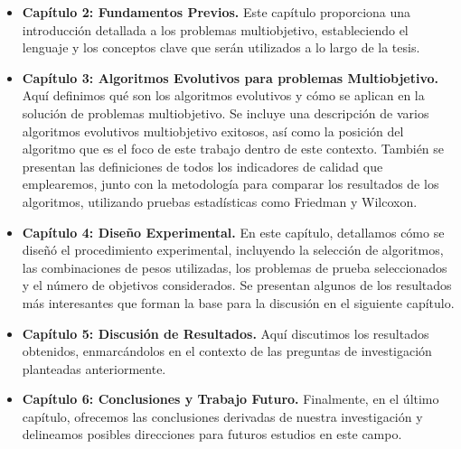 \begin{itemize}
    \item \textbf{Capítulo 2: Fundamentos Previos.} Este capítulo proporciona una introducción detallada a los problemas multiobjetivo, estableciendo el lenguaje y los conceptos clave que serán utilizados a lo largo de la tesis.
    \item \textbf{Capítulo 3: Algoritmos Evolutivos para problemas Multiobjetivo.} Aquí definimos qué son los algoritmos evolutivos y cómo se aplican en la solución de problemas multiobjetivo. Se incluye una descripción de varios algoritmos evolutivos multiobjetivo exitosos, así como la posición del algoritmo que es el foco de este trabajo dentro de este contexto. También se presentan las definiciones de todos los indicadores de calidad que emplearemos, junto con la metodología para comparar los resultados de los algoritmos, utilizando pruebas estadísticas como Friedman y Wilcoxon.
    \item \textbf{Capítulo 4: Diseño Experimental.} En este capítulo, detallamos cómo se diseñó el procedimiento experimental, incluyendo la selección de algoritmos, las combinaciones de pesos utilizadas, los problemas de prueba seleccionados y el número de objetivos considerados. Se presentan algunos de los resultados más interesantes que forman la base para la discusión en el siguiente capítulo.
    \item \textbf{Capítulo 5: Discusión de Resultados.} Aquí discutimos los resultados obtenidos, enmarcándolos en el contexto de las preguntas de investigación planteadas anteriormente.
    \item \textbf{Capítulo 6: Conclusiones y Trabajo Futuro.} Finalmente, en el último capítulo, ofrecemos las conclusiones derivadas de nuestra investigación y delineamos posibles direcciones para futuros estudios en este campo.
\end{itemize}




